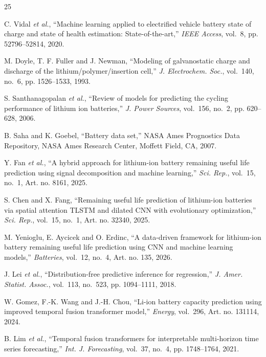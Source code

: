 \documentclass[conference,a4paper]{IEEEtran}
\begin{document}
\begin{thebibliography}{25}
\scriptsize
\setlength{\itemsep}{-1pt}
\setlength{\parskip}{0pt}

 C. Vidal \emph{et al.},
``Machine learning applied to electrified vehicle battery state of charge
and state of health estimation: State-of-the-art,'' \emph{IEEE Access},
vol.~8, pp. 52796--52814, 2020.

 M. Doyle, T. F. Fuller and J. Newman, ``Modeling of
galvanostatic charge and discharge of the lithium/polymer/insertion cell,''
\emph{J. Electrochem. Soc.}, vol.~140, no.~6, pp. 1526--1533, 1993.

 S. Santhanagopalan \emph{et al.}, ``Review of models for predicting the cycling performance of
lithium ion batteries,'' \emph{J. Power Sources}, vol.~156, no.~2,
pp. 620--628, 2006.

 B. Saha and K. Goebel, ``Battery data set,'' NASA Ames
Prognostics Data Repository, NASA Ames Research Center, Moffett Field, CA,
2007.

 Y. Fan \emph{et al.}, ``A hybrid
approach for lithium-ion battery remaining useful life prediction using
signal decomposition and machine learning,'' \emph{Sci. Rep.}, vol.~15,
no.~1, Art. no. 8161, 2025.

 S. Chen and X. Fang, ``Remaining useful life prediction
of lithium-ion batteries via spatial attention TLSTM and dilated CNN with
evolutionary optimization,'' \emph{Sci. Rep.}, vol.~15, no.~1,
Art. no. 32340, 2025.

 M. Yenioglu, E. Aycicek and O. Erdinc, ``A
data-driven framework for lithium-ion battery remaining useful life
prediction using CNN and machine learning models,'' \emph{Batteries},
vol.~12, no.~4, Art. no. 135, 2026.

 J. Lei \emph{et al.}, ``Distribution-free predictive inference for regression,''
\emph{J. Amer. Statist. Assoc.}, vol.~113, no.~523, pp. 1094--1111, 2018.

 W. Gomez, F.-K. Wang and J.-H. Chou, ``Li-ion
battery capacity prediction using improved temporal fusion transformer
model,'' \emph{Energy}, vol.~296, Art. no. 131114, 2024.

 B. Lim \emph{et al.},
``Temporal fusion transformers for interpretable multi-horizon time series
forecasting,'' \emph{Int. J. Forecasting}, vol.~37, no.~4, pp. 1748--1764,
2021.


\end{thebibliography}
\end{document}
